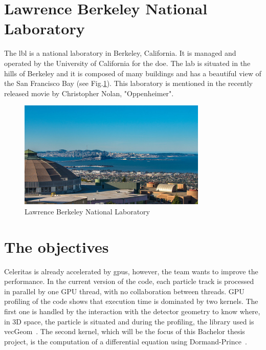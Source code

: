 \section{Lawrence Berkeley National Laboratory}
\label{ch:introduction:lbl}

The \acrfull{lbl} is a national laboratory in Berkeley, California.
It is managed and operated by the University of California for the \acrfull{doe}.
The lab is situated in the hills of Berkeley and it is composed of many buildings
and has a beautiful view of the San Francisco Bay (see Fig.\ref{fig:introduction:lbl:view}).
This laboratory is mentioned in the recently released movie by Christopher Nolan,
"Oppenheimer".

\begin{figure}[ht]
    \centering
    \includegraphics[width=0.8\textwidth]{05-resources/img/spec/lab-view.jpg}
    \caption{Lawrence Berkeley National Laboratory}
    \label{fig:introduction:lbl:view}
\end{figure}


\section{The objectives}
\label{ch:introduction:objectives}

Celeritas is already accelerated by \acrshort{gpu}s, however, the team wants to
improve the performance.
In the current version of the code, each particle track is processed in parallel
by one GPU thread, with no collaboration between threads.
GPU profiling of the code shows that execution time is dominated by two kernels.
The first one is handled by the interaction with the detector geometry to know
where, in 3D space, the particle is situated and during the profiling, the
library used is vecGeom~\cite{VecGeom}.
The second kernel, which will be the focus of this Bachelor thesis project, is
the computation of a differential equation using Dormand-Prince~\cite{princeDormand}.


